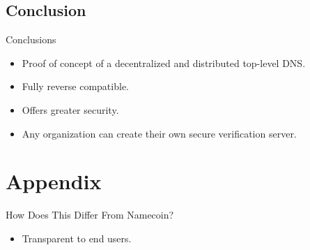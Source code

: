 \documentclass[11pt]{beamer}
\begin{document}
\subsection{Conclusion}
\begin{frame}{Conclusions}
	\begin{itemize}
		\item 	Proof of concept of a decentralized and distributed top-level DNS.
		\item Fully reverse compatible.
		\item Offers greater security.
		\item Any organization can create their own secure verification server.
		
	\end{itemize}
\end{frame}



\section*{Appendix}
\begin{frame}{How Does This Differ From Namecoin?}
	\begin{itemize}
		\item Transparent to end users.
	\end{itemize}
\end{frame}
\end{document}
